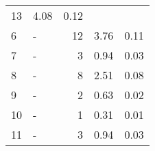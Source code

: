 \begin{longtable}{lXrrr}
       \num{13} &
       \num[round-mode=places,round-precision=2]{4.08} &
         \num[round-mode=places,round-precision=2]{0.12} \\

     6 &
     \multicolumn{1}{X}{ -  } &


       \num{12} &
       \num[round-mode=places,round-precision=2]{3.76} &
         \num[round-mode=places,round-precision=2]{0.11} \\

     7 &
     \multicolumn{1}{X}{ -  } &


       \num{3} &
       \num[round-mode=places,round-precision=2]{0.94} &
         \num[round-mode=places,round-precision=2]{0.03} \\

     8 &
     \multicolumn{1}{X}{ -  } &


       \num{8} &
       \num[round-mode=places,round-precision=2]{2.51} &
         \num[round-mode=places,round-precision=2]{0.08} \\

     9 &
     \multicolumn{1}{X}{ -  } &


       \num{2} &
       \num[round-mode=places,round-precision=2]{0.63} &
         \num[round-mode=places,round-precision=2]{0.02} \\

     10 &
     \multicolumn{1}{X}{ -  } &


       \num{1} &
       \num[round-mode=places,round-precision=2]{0.31} &
         \num[round-mode=places,round-precision=2]{0.01} \\

     11 &
     \multicolumn{1}{X}{ -  } &


       \num{3} &
       \num[round-mode=places,round-precision=2]{0.94} &
         \num[round-mode=places,round-precision=2]{0.03} \\


\end{longtable}
